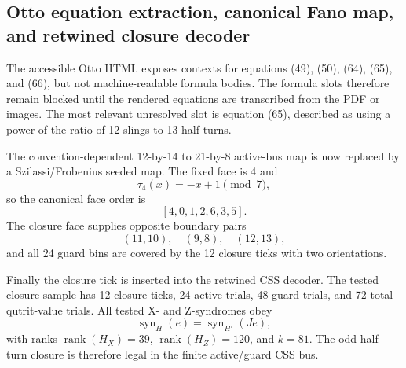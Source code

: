 \subsection{Otto equation extraction, canonical Fano map, and retwined closure decoder}
\label{sec:bt1447-bt1449-equation-fano-closure-decoder}

The accessible Otto HTML exposes contexts for equations (49), (50), (64), (65),
and (66), but not machine-readable formula bodies.  The formula slots therefore
remain blocked until the rendered equations are transcribed from the PDF or
images.  The most relevant unresolved slot is equation (65), described as using
a power of the ratio of 12 slings to 13 half-turns.

The convention-dependent 12-by-14 to 21-by-8 active-bus map is now replaced by a
Szilassi/Frobenius seeded map.  The fixed face is 4 and
\[
\tau_4(x)=-x+1\pmod7,
\]
so the canonical face order is
\[
[4,0,1,2,6,3,5].
\]
The closure face supplies opposite boundary pairs
\[
(11,10),\quad(9,8),\quad(12,13),
\]
and all 24 guard bins are covered by the 12 closure ticks with two orientations.

Finally the closure tick is inserted into the retwined CSS decoder.  The tested
closure sample has 12 closure ticks, 24 active trials, 48 guard trials, and 72
total qutrit-value trials.  All tested X- and Z-syndromes obey
\[
\operatorname{syn}_{H}(e)=\operatorname{syn}_{H'}(Je),
\]
with ranks \(\operatorname{rank}(H_X)=39\), \(\operatorname{rank}(H_Z)=120\),
and \(k=81\).  The odd half-turn closure is therefore legal in the finite
active/guard CSS bus.
